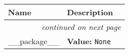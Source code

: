     \vspace{-1cm}
\hspace{\varindent}\begin{longtable}{|p{\varnamewidth}|p{\vardescrwidth}|l}
\cline{1-2}
\cline{1-2} \centering \textbf{Name} & \centering \textbf{Description}& \\
\cline{1-2}
\endhead\cline{1-2}\multicolumn{3}{r}{\small\textit{continued on next page}}\\\endfoot\cline{1-2}
\endlastfoot\raggedright \_\-\_\-p\-a\-c\-k\-a\-g\-e\-\_\-\_\- & \raggedright \textbf{Value:} 
{\tt None}&\\
\cline{1-2}
\end{longtable}

